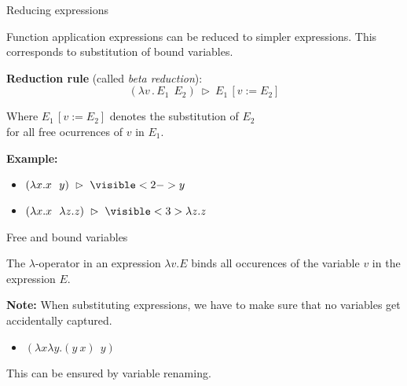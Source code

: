 \documentclass[xcolor=dvipsnames]{beamer}
\begin{document}
\begin{frame}[fragile]{Reducing expressions}

Function application expressions can be reduced to simpler expressions. 
This corresponds to substitution of bound variables.

\vspace{.4cm}

{\bf Reduction rule} (called \emph{beta reduction}): 
$$ (\lambda v\,.\,E_1\ \ E_2)\ \rhd\ E_1\,[v:=E_2] $$

\vspace{-.4cm}

\begin{center}{\small Where $E_1\,[v:=E_2]$ denotes the substitution of $E_2$\\ for 
all free ocurrences of $v$ in $E_1$.}\end{center}

\vspace{.2cm}

{\bf Example:} 
\begin{itemize}
\item $(\lambda x.x\ \ y)\ \rhd\ \visible<2->{y}$
\item $(\lambda x.x\ \ \lambda z.z)\ \rhd\ \visible<3>{\lambda z.z}$
\end{itemize}
\end{frame}

\begin{frame}{Free and bound variables}

The {$\lambda$}-operator in an expression {$\lambda v.E$} 
binds all occurences of the variable {$v$} in the expression {$E$}.

%

\vspace{.4cm}

{\small{\bf Note:} When substituting expressions, we have to make sure 
that no variables get accidentally captured. 
\begin{itemize}
\item $(\lambda x\lambda y.(y\ x)\ \ y)$
\end{itemize}
This can be ensured by {variable renaming}.}
\end{frame}
\end{document}
